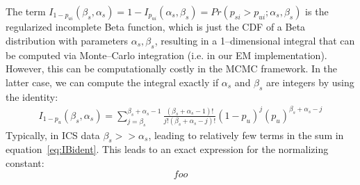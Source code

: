 \documentclass[11pt]{article}
\begin{document}
The term $I_{1-p_{ui}}(\beta_s,\alpha_s)=1-I_{p_{ui}}(\alpha_s,\beta_s)=Pr(p_{si} > p_{ui}; \alpha_s,\beta_s)$ is the regularized incomplete Beta function, which is just the CDF of a Beta distribution with parameters $\alpha_s,\beta_s$, resulting in a 1--dimensional integral that can be computed via Monte--Carlo integration (i.e. in our EM implementation). However, this can be computationally costly in the MCMC framework. In the latter case, we can compute the integral exactly if $\alpha_s$ and $\beta_s$ are integers by using the identity:
\begin{align}
I_{1-p_u}(\beta_s,\alpha_s) = \sum_{j=\beta_s}^{\beta_s+\alpha_s-1} \frac{(\beta_s+\alpha_s-1)!}{j!(\beta_s+\alpha_s-j)!}(1-p_u)^j(p_u)^{\beta_s+\alpha_s-j}
\label{eq:IBident}
\end{align}
Typically, in ICS data $\beta_s>>\alpha_s$, leading to relatively few terms in the sum in equation~\ref{eq:IBident}.  This leads to an exact expression for the normalizing constant:
$$
foo
$$
\end{document}
